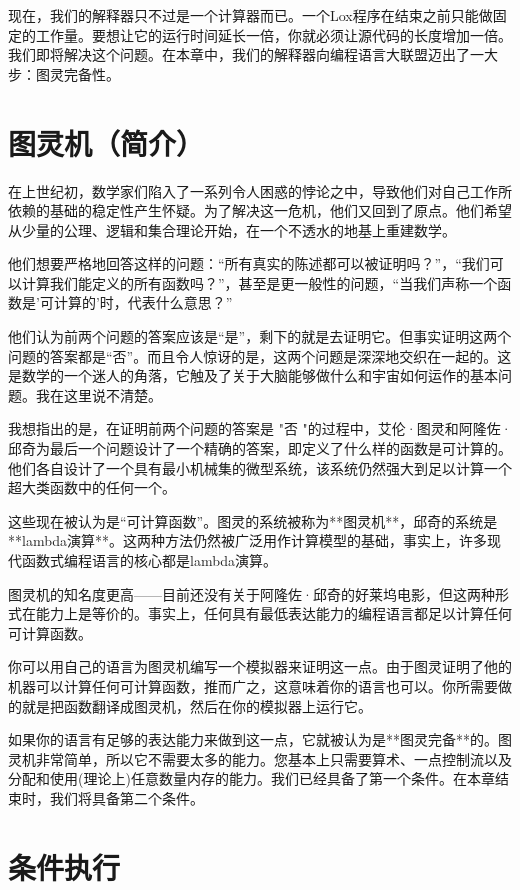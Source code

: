 \documentclass[cn,11pt,chinese]{elegantbook}
\begin{document}
现在，我们的解释器只不过是一个计算器而已。一个Lox程序在结束之前只能做固定的工作量。要想让它的运行时间延长一倍，你就必须让源代码的长度增加一倍。我们即将解决这个问题。在本章中，我们的解释器向编程语言大联盟迈出了一大步：图灵完备性。

\section{图灵机（简介）}

在上世纪初，数学家们陷入了一系列令人困惑的悖论之中，导致他们对自己工作所依赖的基础的稳定性产生怀疑。为了解决这一危机，他们又回到了原点。他们希望从少量的公理、逻辑和集合理论开始，在一个不透水的地基上重建数学。

他们想要严格地回答这样的问题：“所有真实的陈述都可以被证明吗？”，“我们可以计算我们能定义的所有函数吗？”，甚至是更一般性的问题，“当我们声称一个函数是'可计算的'时，代表什么意思？”

他们认为前两个问题的答案应该是“是”，剩下的就是去证明它。但事实证明这两个问题的答案都是“否”。而且令人惊讶的是，这两个问题是深深地交织在一起的。这是数学的一个迷人的角落，它触及了关于大脑能够做什么和宇宙如何运作的基本问题。我在这里说不清楚。

我想指出的是，在证明前两个问题的答案是 "否 "的过程中，艾伦·图灵和阿隆佐·邱奇为最后一个问题设计了一个精确的答案，即定义了什么样的函数是可计算的。他们各自设计了一个具有最小机械集的微型系统，该系统仍然强大到足以计算一个超大类函数中的任何一个。

这些现在被认为是“可计算函数”。图灵的系统被称为**图灵机**，邱奇的系统是**lambda演算**。这两种方法仍然被广泛用作计算模型的基础，事实上，许多现代函数式编程语言的核心都是lambda演算。

图灵机的知名度更高——目前还没有关于阿隆佐·邱奇的好莱坞电影，但这两种形式在能力上是等价的。事实上，任何具有最低表达能力的编程语言都足以计算任何可计算函数。

你可以用自己的语言为图灵机编写一个模拟器来证明这一点。由于图灵证明了他的机器可以计算任何可计算函数，推而广之，这意味着你的语言也可以。你所需要做的就是把函数翻译成图灵机，然后在你的模拟器上运行它。

如果你的语言有足够的表达能力来做到这一点，它就被认为是**图灵完备**的。图灵机非常简单，所以它不需要太多的能力。您基本上只需要算术、一点控制流以及分配和使用(理论上)任意数量内存的能力。我们已经具备了第一个条件。在本章结束时，我们将具备第二个条件。

\section{条件执行}
\end{document}
